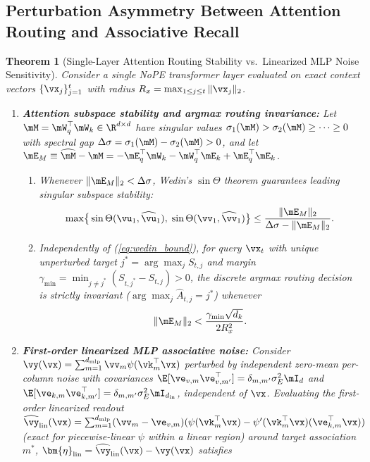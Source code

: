 \documentclass[10pt]{article} %
\renewcommand{\eqref}[1]{(\ref{#1})}
\newtheorem{theorem}{Theorem}
\begin{document}
\subsection{Perturbation Asymmetry Between Attention Routing and Associative Recall}
\label{sec:theory_thm}

\begin{theorem}[Single-Layer Attention Routing Stability vs.\ Linearized MLP Noise Sensitivity]
\label{thm:asymmetry}
Consider a single NoPE transformer layer evaluated on exact context vectors $\{\vx_j\}_{j=1}^{t}$ with radius $R_x = \max_{1 \le j \le t} \|\vx_j\|_2$.
\begin{enumerate}[leftmargin=*,nosep]
    \item \textbf{Attention subspace stability and argmax routing invariance:} Let $\mM = \mW_q^\top \mW_k \in \R^{d \times d}$ have singular values $\sigma_1(\mM) > \sigma_2(\mM) \ge \dots \ge 0$ with spectral gap $\Delta\sigma = \sigma_1(\mM) - \sigma_2(\mM) > 0$, and let $\mE_M \equiv \widehat{\mM} - \mM = -\mE_q^\top \mW_k - \mW_q^\top \mE_k + \mE_q^\top \mE_k$.
    \begin{enumerate}[label=(\alph*),leftmargin=*,nosep]
        \item Whenever $\|\mE_M\|_2 < \Delta\sigma$, Wedin's $\sin\Theta$ theorem \citep{wedin1972perturbation} guarantees leading singular subspace stability:
        \begin{equation}
            \max\!\big\{\sin\Theta(\vu_1, \widehat{\vu}_1),\; \sin\Theta(\vv_1, \widehat{\vv}_1)\big\} \le \frac{\|\mE_M\|_2}{\Delta\sigma - \|\mE_M\|_2}.
            \label{eq:wedin_bound}
        \end{equation}
        \item Independently of \eqref{eq:wedin_bound}, for query $\vx_t$ with unique unperturbed target $j^* = \arg\max_j S_{t,j}$ and margin $\gamma_{\min} = \min_{j \ne j^*}(S_{t,j^*} - S_{t,j}) > 0$, the discrete argmax routing decision is strictly invariant ($\arg\max_j \widehat{A}_{t,j} = j^*$) whenever
        \begin{equation}
            \|\mE_M\|_2 < \frac{\gamma_{\min}\sqrt{d_k}}{2 R_x^2}.
            \label{eq:attn_margin}
        \end{equation}
    \end{enumerate}
    \item \textbf{First-order linearized MLP associative noise:} Consider $\vy(\vx) = \sum_{m=1}^{d_{\text{mlp}}} \vv_m \psi(\vk_m^\top \vx)$ perturbed by independent zero-mean per-column noise with covariances $\E[\ve_{v,m}\ve_{v,m'}^\top] = \delta_{m,m'}\sigma_E^2 \mI_d$ and $\E[\ve_{k,m}\ve_{k,m'}^\top] = \delta_{m,m'}\sigma_E^2 \mI_{d_{\text{in}}}$, independent of $\vx$. Evaluating the first-order linearized readout $\widehat{\vy}_{\text{lin}}(\vx) = \sum_{m=1}^{d_{\text{mlp}}} (\vv_m - \ve_{v,m})(\psi(\vk_m^\top \vx) - \psi'(\vk_m^\top \vx)(\ve_{k,m}^\top \vx))$ (exact for piecewise-linear $\psi$ within a linear region) around target association $m^*$, $\bm{\eta}_{\text{lin}} = \widehat{\vy}_{\text{lin}}(\vx) - \vy(\vx)$ satisfies

\end{enumerate}
\end{theorem}
\end{document}
